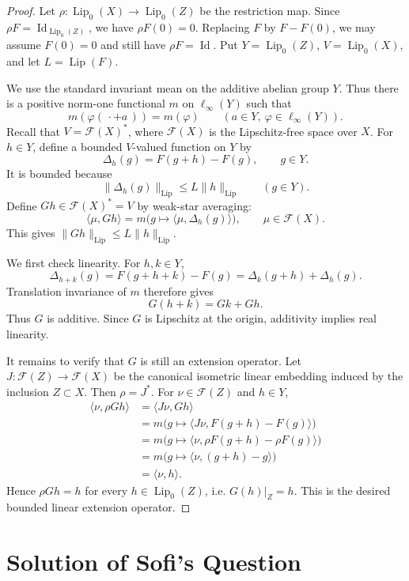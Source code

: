 \documentclass[11pt]{article}
\newcommand{\Lip}{\operatorname{Lip}}
\newcommand{\Lipz}{\operatorname{Lip}_0}
\newcommand{\FF}{\mathcal F}
\newcommand{\Id}{\operatorname{Id}}
\begin{document}
\begin{proof}
Let \(\rho:\Lipz(X)\to\Lipz(Z)\) be the restriction map. Since
\(\rho F=\Id_{\Lipz(Z)}\), we have \(\rho F(0)=0\). Replacing \(F\) by
\(F-F(0)\), we may assume \(F(0)=0\) and still have \(\rho F=\Id\). Put
\(Y=\Lipz(Z)\), \(V=\Lipz(X)\), and let \(L=\Lip(F)\).

We use the standard invariant mean on the additive abelian group \(Y\). Thus
there is a positive norm-one functional \(m\) on \(\ell_\infty(Y)\) such that
\[
        m(\varphi(\,\cdot+a\,))=m(\varphi)
        \qquad (a\in Y,\ \varphi\in \ell_\infty(Y)).
\]
Recall that \(V=\FF(X)^*\), where \(\FF(X)\) is the Lipschitz-free space over
\(X\). For \(h\in Y\), define a bounded \(V\)-valued function on \(Y\) by
\[
        \Delta_h(g)=F(g+h)-F(g),\qquad g\in Y.
\]
It is bounded because
\[
        \|\Delta_h(g)\|_{\Lip}\leq L\|h\|_{\Lip}\qquad(g\in Y).
\]
Define \(G h\in \FF(X)^*=V\) by weak-star averaging:
\[
        \langle \mu,Gh\rangle
        =
        m\bigl(g\mapsto \langle \mu,\Delta_h(g)\rangle\bigr),
        \qquad \mu\in \FF(X).
\]
This gives \(\|Gh\|_{\Lip}\leq L\|h\|_{\Lip}\).

We first check linearity. For \(h,k\in Y\),
\[
 \Delta_{h+k}(g)
 =F(g+h+k)-F(g)
 =\Delta_k(g+h)+\Delta_h(g).
\]
Translation invariance of \(m\) therefore gives
\[
        G(h+k)=Gk+Gh.
\]
Thus \(G\) is additive. Since \(G\) is Lipschitz at the origin, additivity
implies real linearity.

It remains to verify that \(G\) is still an extension operator. Let
\(J:\FF(Z)\to\FF(X)\) be the canonical isometric linear embedding induced by
the inclusion \(Z\subset X\). Then \(\rho=J^*\). For \(\nu\in\FF(Z)\) and
\(h\in Y\),
\begin{align*}
 \langle \nu,\rho Gh\rangle
 &=\langle J\nu,Gh\rangle \\
 &=m\bigl(g\mapsto
      \langle J\nu,F(g+h)-F(g)\rangle\bigr)\\
 &=m\bigl(g\mapsto
      \langle \nu,\rho F(g+h)-\rho F(g)\rangle\bigr)\\
 &=m\bigl(g\mapsto \langle \nu,(g+h)-g\rangle\bigr)\\
 &=\langle \nu,h\rangle .
\end{align*}
Hence \(\rho Gh=h\) for every \(h\in\Lipz(Z)\), i.e. \(G(h)|_Z=h\). This is
the desired bounded linear extension operator.
\end{proof}

\section*{Solution of Sofi's Question}
\end{document}
